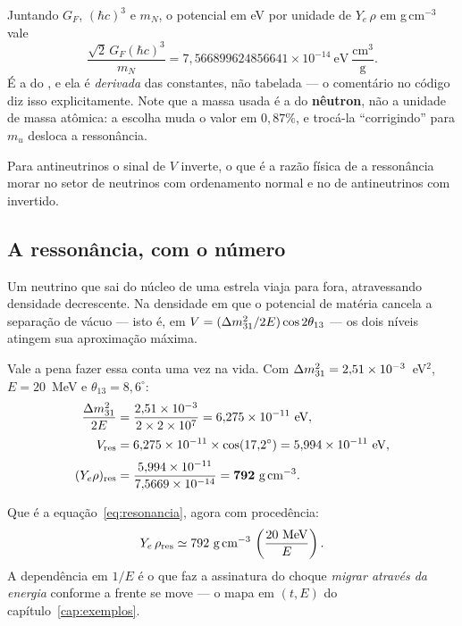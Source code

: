 \begin{nota}
Juntando $G_F$, $(\hbar c)^3$ e $m_N$, o potencial em eV por unidade de
$Y_e\,\rho$ em g\,cm$^{-3}$ vale
\[
  \frac{\sqrt{2}\,G_F (\hbar c)^3}{m_N}
  = 7{,}566899624856641\times10^{-14}\ \text{eV}\ \frac{\text{cm}^3}{\text{g}}.
\]
É a  do , e ela é
\emph{derivada} das constantes, não tabelada --- o comentário no código diz
isso explicitamente. Note que a massa usada é a do \textbf{nêutron}, não a
unidade de massa atômica: a escolha muda o valor em $0{,}87\%$, e trocá-la
``corrigindo'' para $m_u$ desloca a ressonância.
\end{nota}

Para antineutrinos o sinal de $V$ inverte, o que é a razão física de a
ressonância morar no setor de neutrinos com ordenamento normal e no de
antineutrinos com invertido.

\subsection{A ressonância, com o número}

Um neutrino que sai do núcleo de uma estrela viaja para fora, atravessando
densidade decrescente. Na densidade em que o potencial de matéria cancela a
separação de vácuo --- isto é, em
$V = (\Delta m^2_{31}/2E)\cos 2\theta_{13}$ --- os dois níveis atingem sua aproximação
máxima.

Vale a pena fazer essa conta uma vez na vida. Com $\Delta m^2_{31} = 2{,}51\times10^{-3}$~eV$^2$,
$E = 20$~MeV e $\theta_{13} = 8{,}6^\circ$:
\begin{align}
  \frac{\Delta m^2_{31}}{2E} &= \frac{2{,}51\times10^{-3}}{2\times2\times10^{7}}
     = 6{,}275\times10^{-11}\ \text{eV},\\[2pt]
  V_{\rm res} &= 6{,}275\times10^{-11}\times\cos(17{,}2^\circ)
     = 5{,}994\times10^{-11}\ \text{eV},\\[2pt]
  (Y_e\rho)_{\rm res} &= \frac{5{,}994\times10^{-11}}{7{,}5669\times10^{-14}}
     = \mathbf{792}\ \text{g\,cm}^{-3}.
\end{align}

Que é a equação~\eqref{eq:resonancia}, agora com procedência:
\begin{equation}
  Y_e\,\rho_{\rm res} \simeq 792\ \text{g\,cm}^{-3}\,
     \left(\frac{20\ \text{MeV}}{E}\right).
\label{eq:resonancia}
\end{equation}
A dependência em $1/E$ é o que faz a assinatura do choque \emph{migrar através
da energia} conforme a frente se move --- o mapa em $(t,E)$ do
capítulo~\ref{cap:exemplos}.

